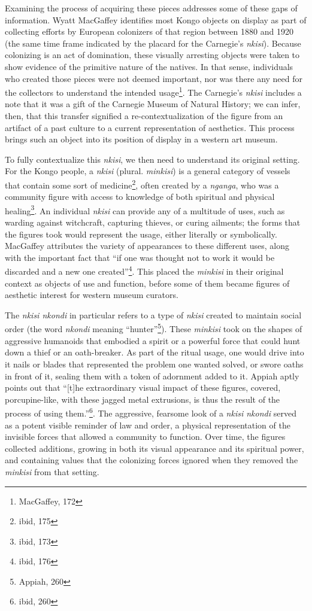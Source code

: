 Examining the process of acquiring these pieces addresses some of these gaps of
information. Wyatt MacGaffey identifies most Kongo objects on display as part of
collecting efforts by European colonizers of that region between 1880 and 1920
(the same time frame indicated by the placard for the Carnegie's
\textit{nkisi}). Because colonizing is an act of domination, these visually
arresting objects were taken to show evidence of the primitive nature of the
natives. In that sense, individuals who created those pieces were not deemed
important, nor was there any need for the collectors to understand the intended
usage\footnote{MacGaffey, 172}. The Carnegie's \textit{nkisi} includes a note
that it was a gift of the Carnegie Museum of Natural History; we can infer,
then, that this transfer signified a re-contextualization of the figure from an
artifact of a past culture to a current representation of aesthetics. This
process brings such an object into its position of display in a western art
museum.

To fully contextualize this \textit{nkisi}, we then need to understand its
original setting. For the Kongo people, a \textit{nkisi} (plural.
\textit{minkisi}) is a general category of vessels that contain some sort of
medicine\footnote{ibid, 175}, often created by a \textit{nganga}, who was a
community figure with access to knowledge of both spiritual and physical
healing\footnote{ibid, 173}. An individual \textit{nkisi} can provide any of a
multitude of uses, such as warding against witchcraft, capturing thieves, or
curing ailments; the forms that the figures took would represent the usage,
either literally or symbolically. MacGaffey attributes the variety of
appearances to these different uses, along with the important fact that ``if one
was thought not to work it would be discarded and a new one
created''\footnote{ibid, 176}. This placed the \textit{minkisi} in their
original context as objects of use and function, before some of them became
figures of aesthetic interest for western museum curators.

The \textit{nkisi nkondi} in particular refers to a type of \textit{nkisi}
created to maintain social order (the word \textit{nkondi} meaning
``hunter''\footnote{Appiah, 260}). These \textit{minkisi} took on the shapes of
aggressive humanoids that embodied a spirit or a powerful force that could hunt
down a thief or an oath-breaker. As part of the ritual usage, one would drive
into it nails or blades that represented the problem one wanted solved, or swore
oaths in front of it, sealing them with a token of adornment added to it. Appiah
aptly points out that ``[t]he extraordinary visual impact of these figures,
covered, porcupine-like, with these jagged metal extrusions, is thus the result
of the process of using them.''\footnote{ibid, 260}. The aggressive, fearsome
look of a \textit{nkisi nkondi} served as a potent visible reminder of law and
order, a physical representation of the invisible forces that allowed a
community to function. Over time, the figures collected additions, growing in
both its visual appearance and its spiritual power, and containing values that
the colonizing forces ignored when they removed the \textit{minkisi} from that
setting.

